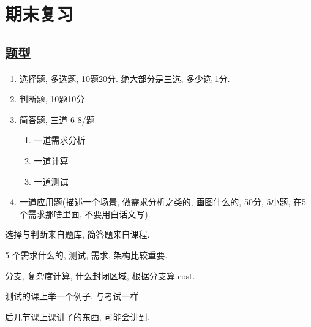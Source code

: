 \newpage
\section{期末复习}
\subsection{题型}
\begin{enumerate}
    \item 选择题, 多选题, 10题20分. 绝大部分是三选, 多少选-1分.
    \item 判断题, 10题10分
    \item 简答题, 三道 6-8/题 
    \begin{enumerate}
        \item 一道需求分析
        \item 一道计算 
        \item 一道测试
    \end{enumerate}
    \item 一道应用题(描述一个场景, 做需求分析之类的, 画图什么的, 50分, 5小题, 在5个需求那啥里面, 不要用白话文写).
\end{enumerate}

选择与判断来自题库, 简答题来自课程. 

5 个需求什么的, 测试, 需求, 架构比较重要. 

分支, 复杂度计算, 什么封闭区域, 根据分支算 cost. 

测试的课上举一个例子, 与考试一样. 

后几节课上课讲了的东西, 可能会讲到. 
